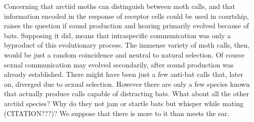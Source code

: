\documentclass[12pt,a4paper,pdftex]{article}
\begin{document}
Concerning that arctiid moths can distinguish between moth calls, and that information encoded in the response of receptor cells could be used in courtship, raises the question if sound production and hearing primarily evolved because of bats. Supposing it did, means that intraspecific communication was only a byproduct of this evolutionary process. The immense variety of moth calls, then, would be just a random coincidence and neutral to natural selection. Of course sexual communication may evolved secondarily, after sound production was already established. There might have been just a few anti-bat calls that, later on, diverged due to sexual selection. However there are only a few species known that actually produce calls capable of distracting bats. What about all the other arctiid species? Why do they not jam or startle bats but whisper while mating (CITATION???)? We suppose that there is more to it than meets the ear. 




\newpage
% 
% 
\printbibliography
\end{document}
